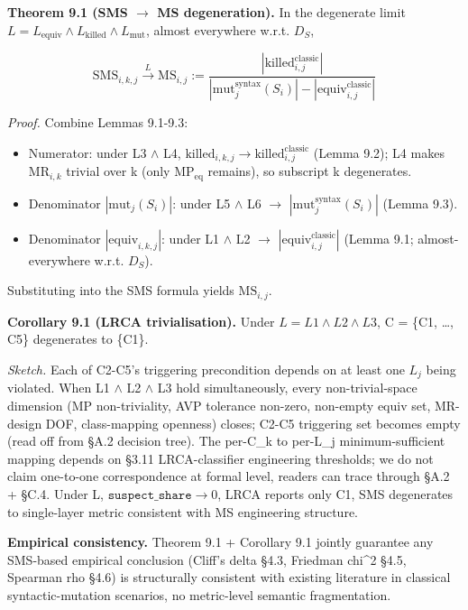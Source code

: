 \documentclass[review,12pt,authoryear]{elsarticle}
\providecommand{\tightlist}{\setlength{\itemsep}{0pt}\setlength{\parskip}{0pt}}
\begin{document}
\textbf{Theorem 9.1 (SMS $\to$ MS degeneration).} In the degenerate limit
$L = L_{\mathrm{equiv}} \wedge L_{\mathrm{killed}} \wedge L_{\mathrm{mut}}$, almost everywhere
w.r.t. $D_S$,

\[ \mathrm{SMS}_{i,k,j} \xrightarrow{L} \mathrm{MS}_{i,j} := \frac{|\mathrm{killed}_{i,j}^{\mathrm{classic}}|}{|\mathrm{mut}_j^{\mathrm{syntax}}(S_i)| - |\mathrm{equiv}_{i,j}^{\mathrm{classic}}|} \]

\emph{Proof.} Combine Lemmas 9.1-9.3:

\begin{itemize}
\tightlist
\item
  Numerator: under L3 $\wedge$ L4, $\mathrm{killed}_{i,k,j} \to
  \mathrm{killed}_{i,j}^{\mathrm{classic}}$ (Lemma 9.2); L4 makes $\mathrm{MR}_{i,k}$ trivial
  over k (only $\mathrm{MP}_{\mathrm{eq}}$ remains), so subscript k degenerates.
\item
  Denominator $|\mathrm{mut}_j(S_i)|$: under L5 $\wedge$ L6 $\to$
  $|\mathrm{mut}_j^{\mathrm{syntax}}(S_i)|$ (Lemma 9.3).
\item
  Denominator $|\mathrm{equiv}_{i,k,j}|$: under L1 $\wedge$ L2 $\to$
  $|\mathrm{equiv}_{i,j}^{\mathrm{classic}}|$ (Lemma 9.1;
  almost-everywhere w.r.t. $D_S$).
\end{itemize}

Substituting into the SMS formula yields $\mathrm{MS}_{i,j}$.

\textbf{Corollary 9.1 (LRCA trivialisation).} Under $L = L1 \wedge L2 \wedge L3$, C
= \{C1, \ldots, C5\} degenerates to \{C1\}.

\emph{Sketch.} Each of C2-C5's triggering precondition depends on at
least one $L_j$ being violated. When L1 $\wedge$ L2 $\wedge$ L3 hold simultaneously,
every non-trivial-space dimension (MP non-triviality, AVP tolerance
non-zero, non-empty equiv set, MR-design DOF, class-mapping openness)
closes; C2-C5 triggering set becomes empty (read off from §A.2 decision
tree). The per-C\_k to per-L\_j minimum-sufficient mapping depends on
§3.11 LRCA-classifier engineering thresholds; we do not claim one-to-one
correspondence at formal level, readers can trace through §A.2 + §C.4.
Under L, $\texttt{suspect\_share} \to 0$, LRCA reports only C1, SMS degenerates to
single-layer metric consistent with \citet{d7c38286734419b52de4262c9802ebdfcf4b9447} MS engineering
structure.

\textbf{Empirical consistency.} Theorem 9.1 + Corollary 9.1 jointly
guarantee any SMS-based empirical conclusion (Cliff's delta §4.3,
Friedman chi\^{}2 §4.5, Spearman rho §4.6) is structurally consistent
with existing \citet{d7c38286734419b52de4262c9802ebdfcf4b9447} literature in classical
syntactic-mutation scenarios, no metric-level semantic fragmentation.
\end{document}
